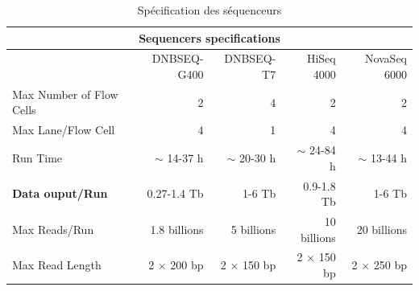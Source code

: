 \begin{table}[H]
\begin{tabular}{ |p{5cm}||r|r|r|r| }
    \hline
    \multicolumn{5}{|c|}{Sequencers specifications} \\\hline
    & \footnotesize{DNBSEQ-G400} & \footnotesize{DNBSEQ-T7} & \footnotesize{HiSeq 4000} & \footnotesize{NovaSeq 6000} \\\hline\hline
    Max Number of Flow Cells & 2 & 4 & 2 & 2 \\\hline
    Max Lane/Flow Cell & 4 & 1 & 4 & 4 \\\hline
    Run Time & $\sim$ 14-37 h & $\sim$ 20-30 h & $\sim$ 24-84 h & $\sim$ 13-44 h \\\hline
    \textbf{Data ouput/Run} & 0.27-1.4 Tb & 1-6 Tb & 0.9-1.8 Tb & 1-6 Tb \\\hline
    Max Reads/Run & 1.8 billions & 5 billions & 10 billions & 20 billions \\\hline
    Max Read Length & 2 $\times$ 200 bp & 2 $\times$ 150 bp & 2 $\times$ 150 bp & 2 $\times$ 250 bp \\\hline
\end{tabular}
    \caption{Spécification des séquenceurs}
    \label{spe-seq}
\end{table}
